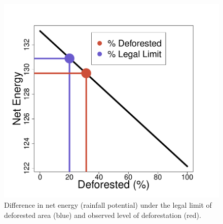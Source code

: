 \documentclass[DIV=calc, paper=a4, fontsize=11pt, twocolumn]{scrartcl}	 %
\begin{document}
\begin{figure}[h]
\vspace{-1em}
  \includegraphics[width=1\linewidth]{Rnet_rec.pdf}
\vspace{-2em}
 \caption{Difference in net energy (rainfall potential) under the legal limit of deforested area (blue) and observed level of deforestation (red). }
  \label{fig:deforest}

\end{figure}






{\scriptsize }

\end{document}
